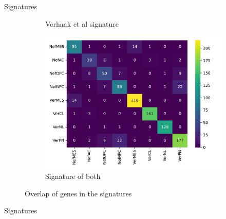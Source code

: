 \documentclass[aspectratio=169,9pt]{beamer}
\begin{document}
\begin{frame}{Signatures}
\begin{adjustwidth}{-5cm}{-5cm}
\begin{figure}
\begin{subfigure}[c]{0.38\textwidth}
                    \caption{Verhaak et al signature}
                \end{subfigure}
                \pause
                \begin{subfigure}[c]{0.38\textwidth}
                    \centering
                    \includegraphics[width=\textwidth]{signature_overlap_All}
                    \caption{Signature of both}
                \end{subfigure}
                \pause[1]\caption{Overlap of genes in the signatures}
            \end{figure}
        \end{adjustwidth}
    \end{frame}

    \begin{frame}{Signatures}
        \begin{table}[]
            \centering
            \caption{Genes common between signatures}
        \end{table}
    \end{frame}
\end{document}
